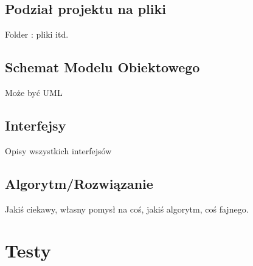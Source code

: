 \documentclass[12pt,a4paper]{article}
\begin{document}
		\subsection{Podział projektu na pliki}
			Folder : pliki itd.
		\subsection{Schemat Modelu Obiektowego}
			Może być UML		
		\subsection{Interfejsy}
			Opisy wszystkich interfejsów
		\subsection{Algorytm/Rozwiązanie}
			Jakiś ciekawy, własny pomysł na coś, jakiś algorytm, coś fajnego.
	\section{Testy}
\end{document}
